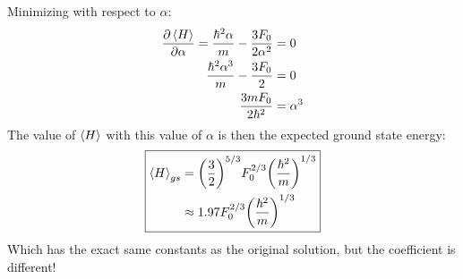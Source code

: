 \documentclass[12pt]{article}
\begin{document}
Minimizing with respect to $\alpha$:
\begin{align*}
  \pdv{\ev{H}}{\alpha}=\frac{\hbar^2\alpha}{m}-\frac{3F_0}{2\alpha^2}&=0\\
  \frac{\hbar^2\alpha^3}{m}-\frac{3F_0}{2}&=0\\
  \frac{3mF_0}{2\hbar^2}&=\alpha^3
\end{align*}
The value of $\ev{H}$ with this value of $\alpha$ is then the expected ground state energy:
\begin{equation}
  \boxed{\begin{aligned}
    \ev{H}_{gs}&=\qty(\frac32)^{5/3}F_0^{2/3}\qty(\frac{\hbar^2}{m})^{1/3}\\
    &\approx 1.97F_0^{2/3}\qty(\frac{\hbar^2}{m})^{1/3}
  \end{aligned}}
\end{equation}
Which has the exact same constants as the original solution, but the coefficient is different!
\end{document}
